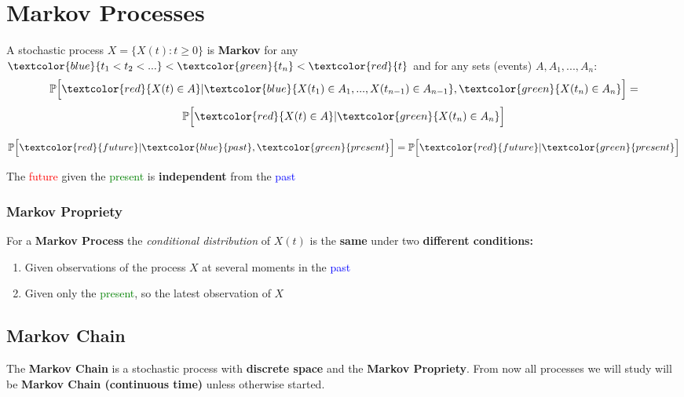 \section{Markov Processes}
\begin{tcolorbox}
A stochastic process \(X=\{X(t): t \geq 0\}\) is \textbf{Markov} for any \(\textcolor{blue}{t_1 < t_2 < ... } < \textcolor{green}{t_n} < \textcolor{red}{t}\) and for any sets (events) \(A, A_1,...,A_n\):
\[\mathbb{P}\Big[\textcolor{red}{X(t) \in A} | \textcolor{blue}{X(t_1) \in A_1,...,X(t_{n-1}) \in A_{n-1}}, \textcolor{green}{X(t_n) \in A_n} \Big] = \]
\[\mathbb{P}\Big[\textcolor{red}{X(t) \in A} | \textcolor{green}{X(t_n) \in A_n} \Big]\]

\[\mathbb{P}\Big[\textcolor{red}{future} | \textcolor{blue}{past}, \textcolor{green}{present} \Big] = \mathbb{P}\Big[\textcolor{red}{future} | \textcolor{green}{present} \Big]\]

\centerline{The \textcolor{red}{future} given the \textcolor{green}{present} is \textbf{independent} from the \textcolor{blue}{past}}
\end{tcolorbox}
\subsubsection{Markov Propriety}
For a \textbf{Markov Process} the \textit{conditional distribution} of \(X(t)\) is the \textbf{same} under two \textbf{different conditions:}
\begin{enumerate}
    \item Given observations of the process \(X\) at several moments in the \textcolor{blue}{past}
    \item Given only the \textcolor{green}{present}, so the latest observation of \(X\)
\end{enumerate}

\subsection{Markov Chain}
\begin{tcolorbox}
The \textbf{Markov Chain} is a stochastic process with \textbf{discrete space} and the \textbf{Markov Propriety}. 
From now all processes we will study will be \textbf{Markov Chain (continuous time)} unless otherwise started.
\end{tcolorbox}

